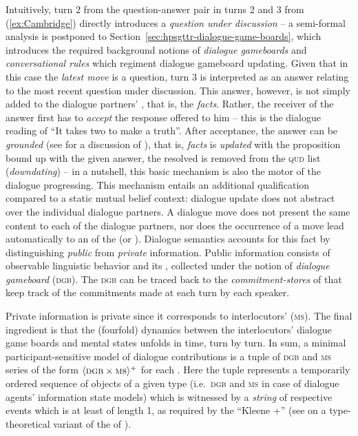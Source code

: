 \documentclass[output=paper,biblatex,babelshorthands,newtxmath,draftmode,colorlinks,citecolor=brown]{langscibook}
\begin{document}
Intuitively, turn 2 from the question-answer pair in turns 2 and 3 from (\ref{ex:Cambridge}) directly introduces a \emph{question under discussion} -- a semi-formal analysis is postponed to Section~\ref{sec:hpsgttr-dialogue-game-boards}, which introduces the required background notions of \emph{dialogue gameboards} and \emph{conversational rules} which regiment dialogue gameboard updating.
%
Given that in this case the \emph{latest move} is a question, turn 3 is interpreted as an answer relating to the most recent question under discussion.
%
This answer, however, is not simply added to the dialogue partners' , that is, the \emph{facts}.
%
Rather, the receiver of the answer first has to \emph{accept} the response offered to him -- this is the dialogue reading of \enquote{It takes two to make a truth}.
%
After acceptance, the answer can be \emph{grounded} (see \citealt[Chapter~4]{Clark:1996} for a discussion of ), that is, \emph{facts} is \emph{updated} with the proposition bound up with the given answer, the resolved  is removed from the \textsc{qud} list (\emph{downdating}) -- in a nutshell, this basic mechanism is also the motor of the dialogue progressing.
%
This mechanism entails an additional qualification compared to a static mutual belief context: dialogue update does not abstract over the individual dialogue partners.
%
A dialogue move does not present the same content to each of the dialogue partners, nor does the occurrence of a move lead automatically to an  of the  (or ).
%
Dialogue semantics accounts for this fact by distinguishing \emph{public} from \emph{private} information. 
%
Public information consists of observable linguistic behavior and its , collected under the notion of \emph{dialogue gameboard} (\textsc{dgb}).
%
The \textsc{dgb} can be traced back to the \emph{commitment-stores} of \citet{Hamblin:1970} that keep track of the commitments made at each turn by each speaker. 

Private information is private since it corresponds to interlocutors'  (\textsc{ms}).
%
The final ingredient is that the (fourfold) dynamics between the interlocutors' dialogue game boards and mental states unfolds in time, turn by turn.
%
In sum, a minimal participant-sensitive model of dialogue contributions is a tuple of \textsc{dgb} and \textsc{ms} series of the form $\langle \textsc{dgb} \times \textsc{ms} \rangle^+$ for each . 
%
Here the tuple represents a temporarily ordered sequence of objects of a given type (i.e.\ \textsc{dgb} and \textsc{ms} in case of dialogue agents' information state models) which is witnessed by a \emph{string} of respective events which is at least of length 1, as required by the \enquote{Kleene +}\is{+}  (see \citealt[Section~2.7]{Cooper:Ginzburg:2015} on a type-theoretical variant of the  of \citealt{Fernando:2011}).
\end{document}
